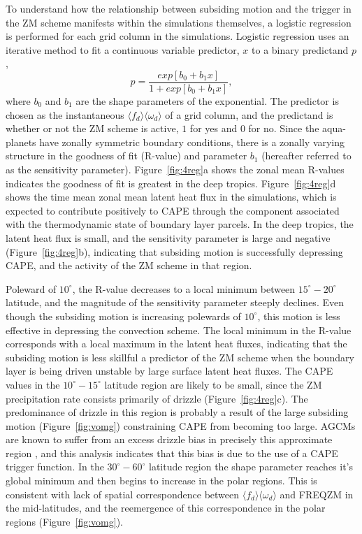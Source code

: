 To understand how the relationship between subsiding motion and the trigger in the ZM scheme manifests within the simulations themselves, a logistic regression is performed for each grid column in the simulations. Logistic regression uses an iterative method to fit a continuous variable predictor, $x$ to a binary predictand $p$ \citep{WILKSBOOK},
\begin{equation}
p = \frac{exp{[b_0 + b_1 x]}}{1 + exp{[b_0 + b_1 x]}}, \label{eq:eq6-3}
\end{equation}
where $b_0$ and $b_1$ are the shape parameters of the exponential. The predictor is chosen as the instantaneous $\langle f_{d} \rangle \langle \omega_{d} \rangle$ of a grid column, and the predictand is whether or not the ZM scheme is active, $1$ for yes and $0$ for no. Since the aqua-planets have zonally symmetric boundary conditions, there is a zonally varying structure in the goodness of fit (R-value) and parameter $b_1$ (hereafter referred to as the sensitivity parameter). Figure~\ref{fig:4reg}a shows the zonal mean R-values indicates the goodness of fit is greatest in the deep tropics. Figure~\ref{fig:4reg}d shows the time mean zonal mean latent heat flux in the simulations, which is expected to contribute positively to CAPE through the component associated with the thermodynamic state of boundary layer parcels. In the deep tropics, the latent heat flux is small, and the sensitivity parameter is large and negative (Figure~\ref{fig:4reg}b), indicating that subsiding motion is successfully depressing CAPE, and the activity of the ZM scheme in that region.

Poleward of $10^{\circ}$, the R-value decreases to a local minimum between $15^{\circ} - 20^{\circ}$ latitude, and the magnitude of the sensitivity parameter steeply declines. Even though the subsiding motion is increasing polewards of $10^{\circ}$, this motion is less effective in depressing the convection scheme. The local minimum in the R-value corresponds with a local maximum in the latent heat fluxes, indicating that the subsiding motion is less skillful a predictor of the ZM scheme when the boundary layer is being driven unstable by large surface latent heat fluxes. The CAPE values in the $10^{\circ} - 15^{\circ}$ latitude region are likely to be small, since the ZM precipitation rate consists primarily of drizzle (Figure~\ref{fig:4reg}c). The predominance of drizzle in this region is probably a result of the large subsiding motion (Figure~\ref{fig:vomg}) constraining CAPE from becoming too large. AGCMs are known to suffer from an excess drizzle bias in precisely this approximate region \citep{D2006JCLIM}, and this analysis indicates that this bias is due to the use of a CAPE trigger function. In the $30^{\circ} - 60^{\circ}$ latitude region the shape parameter reaches it's global minimum and then begins to increase in the polar regions. This is consistent with lack of spatial correspondence between $\langle f_{d} \rangle \langle \omega_{d} \rangle$ and FREQZM in the mid-latitudes, and the reemergence of this correspondence in the polar regions (Figure~\ref{fig:vomg}).

